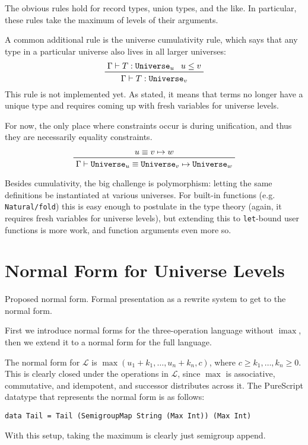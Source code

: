 \documentclass[11pt, twoside, reqno]{book}
\DeclareMathOperator{\imax}{imax}
\begin{document}
The obvious rules hold for record types, union types, and the like.
In particular, these rules take the maximum of levels of their arguments.

A common additional rule is the universe cumulativity rule, which says that any type in a particular universe also lives in all larger universes:
\begin{displaymath}
\prftree{\Gamma \vdash T : \texttt{Universe}_u}{u \le v}{\Gamma \vdash T : \texttt{Universe}_v}
\end{displaymath}
This rule is not implemented yet.
As stated, it means that terms no longer have a unique type and requires coming up with fresh variables for universe levels.

For now, the only place where constraints occur is during unification, and thus they are necessarily equality constraints.
\begin{displaymath}
\prftree{u \equiv v \mapsto w}{\Gamma \vdash \texttt{Universe}_u \equiv \texttt{Universe}_v \mapsto \texttt{Universe}_w}
\end{displaymath}

Besides cumulativity, the big challenge is polymorphism: letting the same definitions be instantiated at various universes.
For built-in functions (e.g. \verb`Natural/fold`) this is easy enough to postulate in the type theory (again, it requires fresh variables for universe levels), but extending this to \verb`let`-bound user functions is more work, and function arguments even more so.

\section{Normal Form for Universe Levels}
\label{nf-uni-lvl}

Proposed normal form. Formal presentation as a rewrite system to get to the normal form.

First we introduce normal forms for the three-operation language without $\imax$, then we extend it to a normal form for the full language.

The normal form for $\mathcal{L}$ is $\max(u_1 + k_1, \dots, u_n + k_n, c)$, where $c \ge k_1, \dots, k_n \ge 0$.
This is clearly closed under the operations in $\mathcal{L}$, since $\max$ is associative, commutative, and idempotent, and successor distributes across it.
The PureScript datatype that represents the normal form is as follows:
\begin{verbatim}
data Tail = Tail (SemigroupMap String (Max Int)) (Max Int)
\end{verbatim}
With this setup, taking the maximum is clearly just semigroup append.
\end{document}
